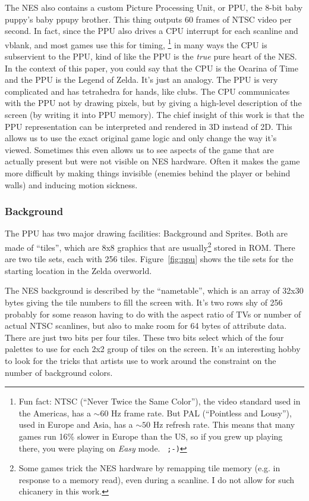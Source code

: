\documentclass[twocolumn]{article}
\begin{document}
The NES also contains a custom Picture Processing Unit, or PPU, the
8-bit baby puppy's baby ppupy brother. This thing outputs 60 frames of
NTSC video per second. In fact, since the PPU also drives a CPU
interrupt for each scanline and vblank, and most games use
this for timing,%
%
\footnote{Fun fact: NTSC (``Never Twice the Same Color''), the video
  standard used in the Americas, has a $\sim\!\!60$ Hz frame rate. But
  PAL (``Pointless and Lousy''), used in Europe and Asia, has a $\sim\!\!50$
  Hz refresh rate. This means that many games run 16\% slower in
  Europe than the US, so if you grew up playing there, you were
  playing on {\em Easy} mode. {\tt\ ;-)}}
%
in many ways the CPU is subservient to the PPU, kind of like the PPU
is the {\it true} pure heart of the NES. In the context of this paper, you
could say that the CPU is the Ocarina of Time and the PPU is the
Legend of Zelda. It's just an analogy. The PPU is very complicated and
has tetrahedra for hands, like clubs. The CPU communicates with
the PPU not by drawing pixels, but by giving a high-level description
of the screen (by writing it into PPU memory). The chief insight of
this work is that the PPU representation can be interpreted and
rendered in 3D instead of 2D. This allows us to use the exact original
game logic and only change the way it's viewed. Sometimes this even
allows us to see aspects of the game that are actually present but
were not visible on NES hardware. Often it makes the game more
difficult by making things invisible (enemies behind the player or
behind walls) and inducing motion sickness.

\subsubsection{Background}
The PPU has two major drawing facilities: Background and Sprites. Both
are made of ``tiles'', which are 8x8 graphics that are
usually\footnote{Some games trick the NES hardware by remapping tile
memory (e.g. in response to a memory read), even during a scanline. I
do not allow for such chicanery in this work.} stored in ROM. There
are two tile sets, each with 256 tiles. Figure~\ref{fig:ppu} shows the
tile sets for the starting location in the Zelda overworld.

The NES background is described by the ``nametable'', which is an
array of 32x30 bytes giving the tile numbers to fill the screen with.
It's two rows shy of 256 probably for some reason having to do with
the aspect ratio of TVs or number of actual NTSC scanlines, but also
to make room for 64 bytes of attribute data. There are just two bits
per four tiles. These two bits select which of the four palettes to
use for each 2x2 group of tiles on the screen. It's an interesting hobby to
look for the tricks that artists use to work around the constraint on
the number of background colors. %
\end{document}
